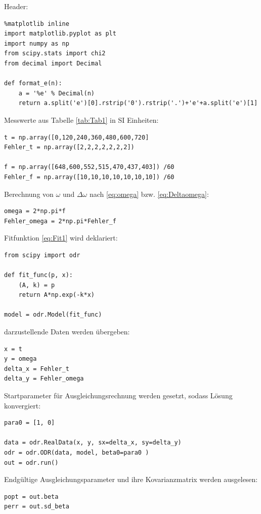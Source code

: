 \documentclass[a4paper,10pt]{article}
\begin{document}
Header:
\begin{lstlisting}
%matplotlib inline
import matplotlib.pyplot as plt
import numpy as np
from scipy.stats import chi2
from decimal import Decimal

def format_e(n):
    a = '%e' % Decimal(n)
    return a.split('e')[0].rstrip('0').rstrip('.')+'e'+a.split('e')[1]
\end{lstlisting}

Messwerte aus Tabelle \ref{tab:Tab1} in SI Einheiten:
\begin{lstlisting}
t = np.array([0,120,240,360,480,600,720]
Fehler_t = np.array([2,2,2,2,2,2,2])

f = np.array([648,600,552,515,470,437,403]) /60
Fehler_f = np.array([10,10,10,10,10,10,10]) /60

\end{lstlisting}

Berechnung von \(\omega\) und \(\Delta\omega\) nach \eqref{eq:omega} bzw. \eqref{eq:Deltaomega}:\begin{lstlisting}
omega = 2*np.pi*f
Fehler_omega = 2*np.pi*Fehler_f

\end{lstlisting}

Fitfunktion \eqref{eq:Fit1} wird deklariert:\begin{lstlisting}
from scipy import odr

def fit_func(p, x):
    (A, k) = p 
    return A*np.exp(-k*x)

model = odr.Model(fit_func)

\end{lstlisting}

darzustellende Daten werden übergeben:\begin{lstlisting}
x = t
y = omega
delta_x = Fehler_t
delta_y = Fehler_omega

\end{lstlisting}

Startparameter für Ausgleichungsrechnung werden gesetzt, sodass Lösung konvergiert:\begin{lstlisting}
para0 = [1, 0]

data = odr.RealData(x, y, sx=delta_x, sy=delta_y)
odr = odr.ODR(data, model, beta0=para0 )
out = odr.run()

\end{lstlisting}

Endgültige Ausgleichungsparameter und ihre Kovarianzmatrix werden ausgelesen:\begin{lstlisting}
popt = out.beta
perr = out.sd_beta

\end{lstlisting}
\end{document}
